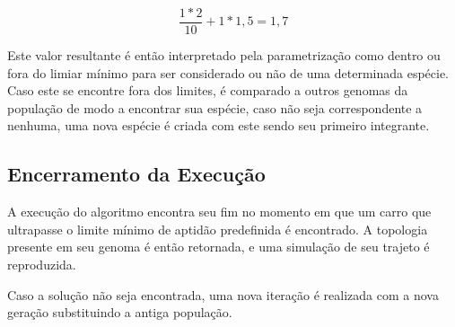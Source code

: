 \[ \frac{1 * 2}{10} + 1 * 1,5 = 1,7\]

Este valor resultante é então interpretado pela parametrização como dentro ou fora do
limiar mínimo para ser considerado ou não de uma determinada espécie. Caso este se
encontre fora dos limites, é comparado a outros genomas da população de modo a encontrar
sua espécie, caso não seja correspondente a nenhuma, uma nova espécie é criada com este sendo seu primeiro integrante.

\subsection{Encerramento da Execução}
A execução do algoritmo encontra seu fim no momento em que um carro
que ultrapasse o limite mínimo de aptidão predefinida é encontrado.
A topologia presente em seu genoma é então retornada, e uma simulação de seu trajeto é reproduzida.

Caso a solução não seja encontrada, uma nova iteração é realizada com a nova geração substituindo a antiga população.
